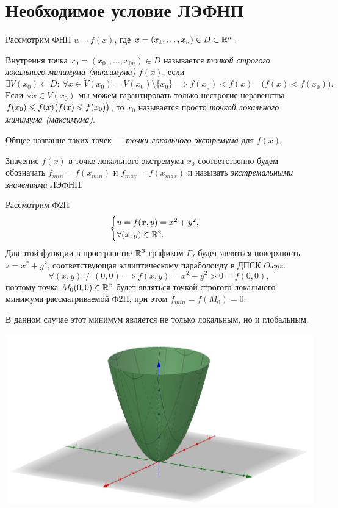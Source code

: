 \documentclass[../../main.tex]{subfiles}
\begin{document}
	\section{Необходимое условие ЛЭФНП}
	Рассмотрим ФНП $u = f (x)$,
	где $x = (x_1, \ldots, x_n) \in D \subset \R^n$.
	
	Внутрення точка $x_0 = (x_{0 1}, \ldots, x_{0n}) \in D$
	называется \emph{точкой строгого локального минимума (максимума)}
	$f(x)$,
	если
	\[
		\exists V (x_0) \subset D:
		\ \forall x \in \dot{V} (x_0)
		= V (x_0) \setminus \{x_0\}
		\implies f (x_0) < f (x)
		\quad \big(f (x) < f (x_0)\big).
	\]
	Если $\forall x \in V (x_0)$ мы можем гарантировать
	только нестрогие неравенства $f (x_0) \le f (x)
	\\ \displaystyle
	\big(f (x) \le f (x_0)\big)$,
	то $x_0$ называется просто \emph{точкой локального минимума (максимума)}.
	
	Общее название таких точек
	--- \emph{точки локального экстремума} для $f (x)$.
	
	Значение $f (x)$ в точке локального экстремума $x_0$
	соответственно будем обозначать
	$f_{min} = f (x_{min})$ и $f_{max} = f (x_{max})$
	и называть \emph{экстремальными значениями} ЛЭФНП.
	
	\begin{exmp}
		Рассмотрим Ф2П
		\[
		\begin{cases}
			u = f (x, y) = x^2 + y^2, \\
			\forall (x, y) \in \R^2. \\
		\end{cases}
		\]
		Для этой функции в пространстве $\R^3$ графиком $\Gamma_f$
		будет являться поверхность $z = x^2 + y^2$,
		соответствующая эллиптическому параболоиду в ДПСК $Oxyz$.
		\[
			\forall (x, y) \ne (0, 0)
			\implies
			f (x, y) = x^2 + y^2 > 0 = f (0, 0),
		\]
		поэтому точка $M_0 (0, 0) \in \R^2$
		будет являться точкой строгого локального минимума рассматриваемой Ф2П,
		при этом $f_{min} = f (M_0) = 0$.
		
		В данном случае
		этот минимум является не только локальным, но и глобальным.
		
		\includegraphics[width=0.9\linewidth]{Ellyptic_paraboloid}
		
	\end{exmp}
	
\end{document}
